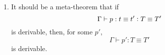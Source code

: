 \documentclass[11pt]{article}
\newcommand{\eqd}{\equiv}
\newcommand{\ccolon}{\vcentcolon}
\newcommand{\TYPE}{\mathop{\text{ \sc type}}}
\newcommand{\Okay}{\mathop{\text{ \sc okay}}}
\newcommand{\Context}{\vdash\Okay}
\renewcommand{\Context}{\vdash}
\newcommand{\var}{\char`_}
\begin{document}
\begin{enumerate}
\[
  \inferrule{\Gamma \vdash t \ccolon T}
       {\Gamma, \var \ccolon T \Context}
\]
\[
  \inferrule{\Gamma, \var \ccolon T \Context}
       {\Gamma \vdash T \TYPE}
\]

\[
  \inferrule{\Gamma \vdash p \ccolon T \eqd T'}
       {\Gamma, \var \ccolon T \eqd T' \Context}
\]
\[
  \inferrule{\Gamma, \var \ccolon T \eqd T' \Context}
       {\Gamma \vdash T \TYPE}
\]

\[
  \inferrule{\Gamma \vdash p \ccolon T \eqd T'}
       {\Gamma, \var \ccolon T \eqd T' \Context}
\]
\[
  \inferrule{\Gamma, \var \ccolon T \eqd T' \Context}
       {\Gamma \vdash T' \TYPE}
\]

\[
  \inferrule{\Gamma \vdash p : t \eqd t' \ccolon T \eqd T'}
       {\Gamma, \var : t \eqd t' \ccolon T \eqd T' \Context}
\]
\[
  \inferrule{\Gamma, \var : t \eqd t' \ccolon T \eqd T' \Context}
       {\Gamma \vdash t \ccolon T}
\]

\[
  \inferrule{\Gamma \vdash p : t \eqd t' \ccolon T \eqd T'}
       {\Gamma, \var : t \eqd t' \ccolon T \eqd T' \Context}
\]
\[
  \inferrule{\Gamma, \var : t \eqd t' \ccolon T \eqd T' \Context}
       {\Gamma \vdash t' \ccolon T'}
\]

\item
It should be a meta-theorem that if
\[{\Gamma \vdash p : t \eqd t' \ccolon T \eqd T'}\]
is derivable, then, for some $p'$,
\[{\Gamma \vdash p' : T \eqd T'}\]
is derivable.

\end{enumerate}



\end{document}
